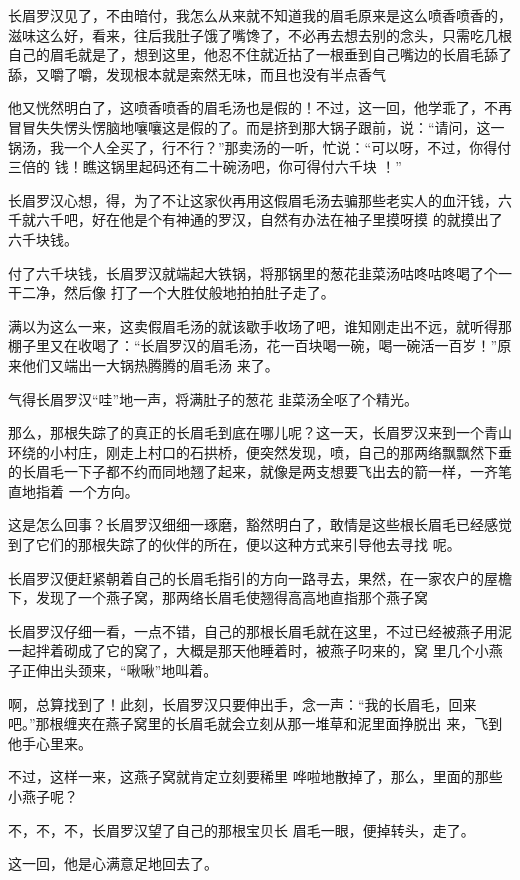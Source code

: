 \documentclass{article}
\begin{document}
长眉罗汉见了，不由暗付，我怎么从来就不知道我的眉毛原来是这么喷香喷香的，滋味这么好，看来，往后我肚子饿了嘴馋了，不必再去想去别的念头，只需吃几根自己的眉毛就是了，想到这里，他忍不住就近拈了一根垂到自己嘴边的长眉毛舔了舔，又嚼了嚼，发现根本就是索然无味，而且也没有半点香气

他又恍然明白了，这喷香喷香的眉毛汤也是假的！不过，这一回，他学乖了，不再冒冒失失愣头愣脑地嚷嚷这是假的了。而是挤到那大锅子跟前，说：“请问，这一锅汤，我一个人全买了，行不行？”那卖汤的一听，忙说：“可以呀，不过，你得付三倍的
\newpage
钱！瞧这锅里起码还有二十碗汤吧，你可得付六千块
！” 

长眉罗汉心想，得，为了不让这家伙再用这假眉毛汤去骗那些老实人的血汗钱，六千就六千吧，好在他是个有神通的罗汉，自然有办法在袖子里摸呀摸
的就摸出了六千块钱。 

付了六千块钱，长眉罗汉就端起大铁锅，将那锅里的葱花韭菜汤咕咚咕咚喝了个一干二净，然后像
打了一个大胜仗般地拍拍肚子走了。 

满以为这么一来，这卖假眉毛汤的就该歇手收场了吧，谁知刚走出不远，就听得那棚子里又在收喝了：“长眉罗汉的眉毛汤，花一百块喝一碗，喝一碗活一百岁！”原来他们又端出一大锅热腾腾的眉毛汤
来了。 

气得长眉罗汉“哇”地一声，将满肚子的葱花
韭菜汤全呕了个精光。 

\newpage

那么，那根失踪了的真正的长眉毛到底在哪儿呢？这一天，长眉罗汉来到一个青山环绕的小村庄，刚走上村口的石拱桥，便突然发现，喷，自己的那两络飘飘然下垂的长眉毛一下子都不约而同地翘了起来，就像是两支想要飞出去的箭一样，一齐笔直地指着
一个方向。 

这是怎么回事？长眉罗汉细细一琢磨，豁然明白了，敢情是这些根长眉毛已经感觉到了它们的那根失踪了的伙伴的所在，便以这种方式来引导他去寻找
呢。 

长眉罗汉便赶紧朝着自己的长眉毛指引的方向一路寻去，果然，在一家农户的屋檐下，发现了一个燕子窝，那两络长眉毛使翘得高高地直指那个燕子窝

长眉罗汉仔细一看，一点不错，自己的那根长眉毛就在这里，不过已经被燕子用泥一起拌着砌成了它的窝了，大概是那天他睡着时，被燕子叼来的，窝
里几个小燕子正伸出头颈来，“啾啾”地叫着。 

\newpage

啊，总算找到了！此刻，长眉罗汉只要伸出手，念一声：“我的长眉毛，回来吧。”那根缠夹在燕子窝里的长眉毛就会立刻从那一堆草和泥里面挣脱出
来，飞到他手心里来。 

不过，这样一来，这燕子窝就肯定立刻要稀里
哗啦地散掉了，那么，里面的那些小燕子呢？ 

不，不，不，长眉罗汉望了自己的那根宝贝长
眉毛一眼，便掉转头，走了。 

这一回，他是心满意足地回去了。
\end{document}
